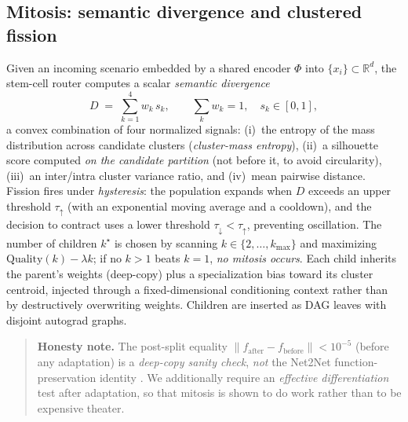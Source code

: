 \documentclass[11pt]{article}
\newcommand{\R}{\mathbb{R}}
\begin{document}
\subsection{Mitosis: semantic divergence and clustered fission}
Given an incoming scenario embedded by a shared encoder $\Phi$ into
$\{x_i\}\subset\R^d$, the stem-cell router computes a scalar \emph{semantic
divergence}
\begin{equation}
D \;=\; \sum_{k=1}^{4} w_k\, s_k, \qquad
\textstyle\sum_k w_k = 1,\quad s_k\in[0,1],
\label{eq:divergence}
\end{equation}
a convex combination of four normalized signals: (i)~the entropy of the mass
distribution across candidate clusters (\emph{cluster-mass entropy}), (ii)~a
silhouette score \cite{rousseeuw1987silhouettes} computed \emph{on the candidate
partition} (not before it, to avoid circularity), (iii)~an inter/intra cluster
variance ratio, and (iv)~mean pairwise distance. Fission fires under
\emph{hysteresis}: the population expands when $D$ exceeds an upper threshold
$\tau_{\uparrow}$ (with an exponential moving average and a cooldown), and the
decision to contract uses a lower threshold $\tau_{\downarrow}<\tau_{\uparrow}$,
preventing oscillation. The number of children $k^\star$ is chosen by scanning
$k\in\{2,\dots,k_{\max}\}$ and maximizing $\mathrm{Quality}(k)-\lambda k$;
if no $k>1$ beats $k=1$, \emph{no mitosis occurs}. Each child inherits the
parent's weights (deep-copy) plus a specialization bias toward its cluster
centroid, injected through a fixed-dimensional conditioning context rather than
by destructively overwriting weights. Children are inserted as DAG leaves with
disjoint autograd graphs.

\begin{quotation}
\noindent\textbf{Honesty note.} The post-split equality
$\lVert f_{\text{after}}-f_{\text{before}}\rVert<10^{-5}$ (before any adaptation)
is a \emph{deep-copy sanity check}, \emph{not} the Net2Net function-preservation
identity \cite{chen2016net2net}. We additionally require an \emph{effective
differentiation} test after adaptation, so that mitosis is shown to do work
rather than to be expensive theater.
\end{quotation}
\end{document}
